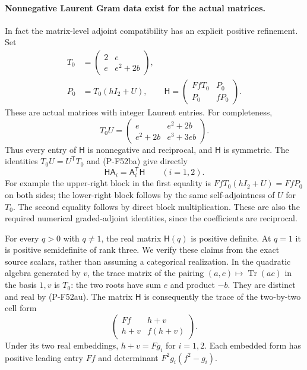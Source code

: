 \documentclass[11pt,a4paper]{article}
\begin{document}
\paragraph{Nonnegative Laurent Gram data exist for the actual matrices.}
In fact the matrix-level adjoint compatibility has an
explicit positive refinement. Set
\[
 \begin{split}
 T_0&=\begin{pmatrix}2&e\\e&e^2+2b\end{pmatrix},\\
 P_0&=T_0(hI_2+U),\qquad
 \mathsf H=\begin{pmatrix}FfT_0&P_0\\P_0&fP_0\end{pmatrix}.
 \end{split}                                                    \tag{P-F52bg}
\]
These are actual matrices with integer Laurent entries.
For completeness,
\[
 T_0U=\begin{pmatrix}
 e&e^2+2b\\ e^2+2b&e^3+3eb
 \end{pmatrix}.
                                                               \tag{P-F52bh}
\]
Thus every entry of $\mathsf H$ is nonnegative and
reciprocal, and $\mathsf H$ is symmetric. The identities
$T_0U=U^{\mathsf T}T_0$ and (P-F52ba) give directly
\[
             \mathsf H\mathsf A_i
                      =\mathsf A_i^{\mathsf T}\mathsf H
                       \qquad(i=1,2).
                                                               \tag{P-F52bi}
\]
For example the upper-right block in the first equality
is $FfT_0(hI_2+U)=FfP_0$ on both sides; the lower-right
block follows by the same self-adjointness of $U$ for
$T_0$. The second equality follows by direct block
multiplication. These are also the required numerical
graded-adjoint identities, since the coefficients are
reciprocal.

For every $q>0$ with $q\ne1$, the real matrix $\mathsf H(q)$
is positive definite. At $q=1$ it is positive semidefinite
of rank three. We verify these claims from the exact
source scalars, rather than assuming a categorical
realization. In the quadratic algebra generated by $v$,
the trace matrix of the pairing $(a,c)\mapsto
\operatorname{Tr}(ac)$ in the basis $1,v$ is $T_0$:
the two roots have sum $e$ and product $-b$.
They are distinct and real by (P-F52au).
The matrix $\mathsf H$ is consequently the trace of the
two-by-two cell form
\[
           \begin{pmatrix}
               Ff&h+v\\h+v&f(h+v)
           \end{pmatrix}.
                                                               \tag{P-F52bj}
\]
Under its two real embeddings, $h+v=Fg_i$ for
$i=1,2$. Each embedded form has positive leading entry
$Ff$ and determinant $F^2g_i(f^2-g_i)$.
\end{document}
